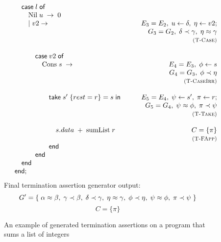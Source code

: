 \begin{figure}
\[\begin{array}{lr}
            \hspace{2em}    \textsf{case}\; l\; \textsf{of} \\
            \hspace{3em}        \text{Nil}\; u\; \rightarrow\; 0 \\
            \hspace{3em}    |\; v2 \rightarrow 
                & E_3 = E_2,\; u \leftarrow \delta,\; \eta \leftarrow v2; \\
                & G_3 = G_2,\; \delta \prec \gamma,\; \eta \approx \gamma \\
                & \textsc{\footnotesize (T-Case)}\\
                \\
            \hspace{4em}    \textsf{case}\; v2\; \textsf{of} \\
            \hspace{5em}    \text{Cons}\; s\; \rightarrow 
                & E_4 = E_3,\; \phi \leftarrow s \\
                & G_4 = G_3,\; \phi \prec \eta \\
                & \textsc{\footnotesize (T-CaseIrr)} \\
                \\
            \hspace{6em}    \textsf{take}\; s'\; \{ rest = r \} = s\; \textsf{in} \hspace{2em}
                & E_5 = E_4,\; \psi \leftarrow s',\; \pi \leftarrow r;  \\
                & G_5 = G_4,\; \psi \approx \phi,\; \pi \prec \psi  \\
                & \textsc{\footnotesize (T-Take)} \\
                \\
            \hspace{7em}        s.data\; +\; \text{sumList}\; r
                & C = \{\pi\}\\
                & \textsc{\footnotesize (T-FApp)}\\
            \hspace{6em}    \textsf{end} \\
            \hspace{4em}    \textsf{end} \\
            \hspace{2em}    \textsf{end} \\
            \hspace{1em}    \textsf{end};
        \end{array}
    \]
    Final termination assertion generator output:
    \[
        G' = \{\;
            \alpha \approx \beta,\;
            \gamma \prec \beta,\;
            \delta \prec \gamma,\;
            \eta \approx \gamma,\;
            \phi \prec \eta,\;
            \psi \approx \phi,\;
            \pi \prec \psi\;
        \}
    \]
    \[
        C = \{\pi\}    
    \]

    
    \caption{An example of generated termination assertions on a program
             that sums a list of integers}
    \label{fig:exampletermination}
\end{figure}

